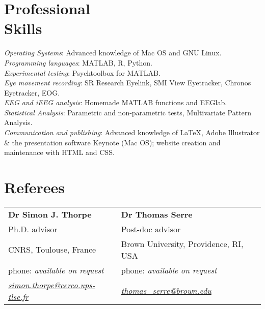 \documentclass[margin,line]{resume}
\begin{document}
\begin{resume}


	\vspace{3mm}
    \section{\mysidestyle Professional\\Skills}
	\textsl{Operating Systems}: Advanced knowledge of Mac OS and GNU Linux.\\
	\textsl{Programming languages}: MATLAB, R, Python.\\
	\textsl{Experimental testing}: Psychtoolbox for MATLAB.\\
	\textsl{Eye movement recording}: SR Research Eyelink, SMI View Eyetracker, Chronos Eyetracker, EOG.\\
	\textsl{EEG and iEEG analysis}: Homemade MATLAB functions and EEGlab.\\
	\textsl{Statistical Analysis}: Parametric and non-parametric tests, Multivariate Pattern Analysis.\\
	\textsl{Communication and publishing}: Advanced knowledge of \LaTeX, Adobe Illustrator \& the presentation software Keynote (Mac OS); website creation and maintenance with HTML and CSS.


	\section{\mysidestyle Referees} 

	\begin{tabular}{@{}p{6cm}p{6cm}}
	\textbf{Dr Simon J. Thorpe}       &  \textbf{Dr Thomas Serre}                   \\
	Ph.D. advisor                               &  Post-doc advisor                       \\
	CNRS, Toulouse, France          &  Brown University, Providence, RI, USA        \\
	phone: \textsl{available on request}    &  phone: \textsl{available on request}     \\
	\textsl{\href{mailto:simon.thorpe@cerco.ups-tlse.fr}{simon.thorpe@cerco.ups-tlse.fr}}   &  
	\textsl{\href{mailto:thomas_serre@brown.edu}{thomas\_serre@brown.edu}}    \\
	\end{tabular}
	

\end{resume}
\end{document}

